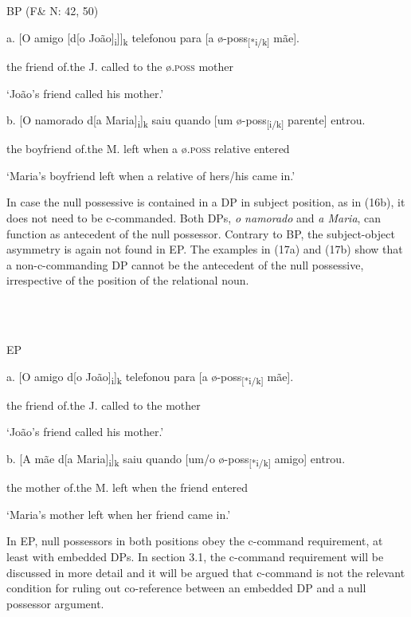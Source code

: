 \documentclass[output=paper]{langsci/langscibook}
\begin{document}
\ea%
    \label{ex:key:16}
    \gll\\
        \\
    \glt
    \z

          BP (F\& N: 42, 50)

  a.  [O amigo [d[o João]\textsubscript{i}]]\textsubscript{k} telefonou para [a ø-poss\textsubscript{[}\textsubscript{*i/k]} mãe].

the friend of.the J. called to the ø\textsc{.poss} mother

‘João’s friend called his mother.’

  b.  [O namorado d[a Maria]\textsubscript{i}]\textsubscript{k} saiu quando [um ø-poss\textsubscript{[i/}\textsubscript{k]} parente] entrou.

the boyfriend of.the M. left when a ø\textsc{.poss} relative entered

‘Maria’s boyfriend left when a relative of hers/his came in.’

In case the null possessive is contained in a DP in subject position, as in (16b), it does not need to be c-commanded. Both DPs, \textit{o namorado} and \textit{a Maria}, can function as antecedent of the null possessor. Contrary to BP, the subject-object asymmetry is again not found in EP. The examples in (17a) and (17b) show that a non-c-commanding DP cannot be the antecedent of the null possessive, irrespective of the position of the relational noun.

\ea%
    \label{ex:key:17}
    \gll\\
        \\
    \glt
    \z

          EP

  a.  [O amigo d[o João]\textsubscript{i}]\textsubscript{k} telefonou para [a ø-poss\textsubscript{[*}\textsubscript{i/k]} mãe].

the friend of.the J. called to the mother

‘João’s friend called his mother.’

  b.  [A mãe d[a Maria]\textsubscript{i}]\textsubscript{k} saiu quando [um/o ø-poss\textsubscript{[*i/k]} amigo] entrou.

the mother of.the M. left when the friend entered

‘Maria’s mother left when her friend came in.’

In EP, null possessors in both positions obey the c-command requirement, at least with embedded DPs. In section 3.1, the c-command requirement will be discussed in more detail and it will be argued that c-command is not the relevant condition for ruling out co-reference between an embedded DP and a null possessor argument.
\end{document}
